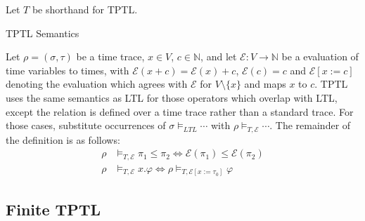 \documentclass[a4paper]{article}
\newcommand{\eval}{\mathcal{E}}
\begin{document}
Let $T$ be shorthand for TPTL.

\begin{defn}{TPTL Semantics}

  Let $\rho = (\sigma,\tau)$ be a time trace, $x\in V$, $c\in\mathbb{N}$, and let $\eval:V\to\mathbb{N}$ be a evaluation of time variables to times, with $\eval(x + c) = \eval(x) + c$, $\eval(c) = c$ and $\eval[x:=c]$ denoting the evaluation which agrees with $\eval$ for $V\setminus\{x\}$ and maps $x$ to $c$.
  TPTL uses the same semantics as LTL for those operators which overlap with LTL, except the relation is defined over a time trace rather than a standard trace. For those cases, substitute occurrences of $\sigma\vDash_{LTL}\cdots$ with $\rho\vDash_{T,\eval}\cdots$. The remainder of the definition is as follows:
  \begin{align*}
    \rho&\vDash_{T,\eval}\pi_1\leq\pi_2 \iff \eval(\pi_1)\leq\eval(\pi_2)\\
    \rho&\vDash_{T,\eval} x.\varphi \iff \rho\vDash_{T,\eval[x:=\tau_0]}\varphi
  \end{align*}
\end{defn}

\subsection{Finite TPTL}
\end{document}
